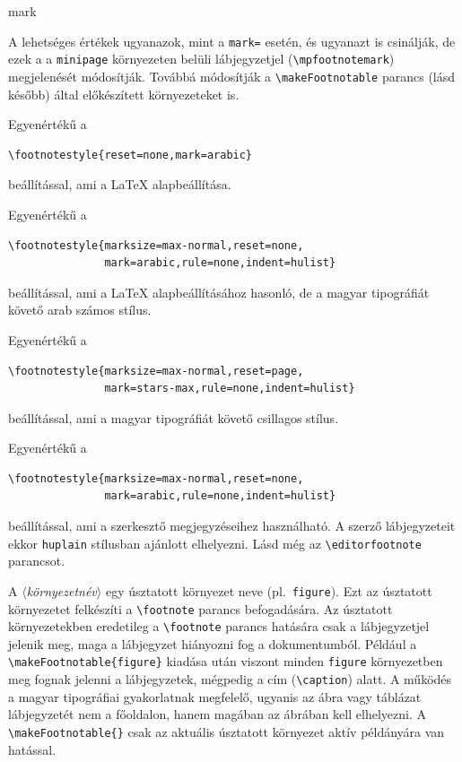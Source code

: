 \documentclass[12pt]{article}
\newcommand\param[1]{{\normalfont\slshape$\langle$#1$\rangle$}}
\begin{document}
\begin{description}
\begin{footstyle}{mark}
\end{footstyle}

\item[mpmark=\param{érték}]
A lehetséges értékek ugyanazok, mint a \texttt{mark=} esetén, és ugyanazt is csinálják, de ezek a a \texttt{minipage} környezeten belüli lábjegyzetjel (\verb|\mpfootnotemark|) megjelenését módosítják.
Továbbá módosítják a \verb|\makeFootnotable| parancs (lásd később) által előkészített környezeteket is.

\item[plain]
Egyenértékű a
\begin{verbatim}
\footnotestyle{reset=none,mark=arabic}
\end{verbatim}
beállítással, ami a \LaTeX{} alapbeállítása.

\item[huplain]
Egyenértékű a
\begin{verbatim}
\footnotestyle{marksize=max-normal,reset=none,
               mark=arabic,rule=none,indent=hulist}
\end{verbatim}
beállítással, ami a \LaTeX{} alapbeállításához hasonló, de a magyar tipográfiát követő arab számos stílus.

\item[starplain]
Egyenértékű a
\begin{verbatim}
\footnotestyle{marksize=max-normal,reset=page,
               mark=stars-max,rule=none,indent=hulist}
\end{verbatim}
beállítással, ami a magyar tipográfiát követő csillagos stílus.

\item[editor]
Egyenértékű a
\begin{verbatim}
\footnotestyle{marksize=max-normal,reset=none,
               mark=arabic,rule=none,indent=hulist}
\end{verbatim}
beállítással, ami a szerkesztő megjegyzéseihez használható.
A szerző lábjegyzeteit ekkor \texttt{huplain} stílusban ajánlott elhelyezni.
Lásd még az \verb|\editorfootnote| parancsot.

\end{description}

\begin{latexcode}
\makeFootnotable{(*\param{környezetnév}*)}
\end{latexcode}
A \param{környezetnév} egy úsztatott környezet neve (pl.~\texttt{figure}).
Ezt az úsztatott környezetet felkészíti a \verb|\footnote| parancs befogadására.
Az úsztatott környezetekben eredetileg a \verb|\footnote| parancs hatására csak a lábjegyzetjel jelenik meg, maga a lábjegyzet hiányozni fog a dokumentumból.
Például a \verb|\makeFootnotable{figure}| kiadása után viszont minden \texttt{figure} környezetben meg fognak jelenni a lábjegyzetek, mégpedig a cím (\verb|\caption|) alatt.
A működés a magyar tipográfiai gyakorlatnak megfelelő, ugyanis az ábra vagy táblázat lábjegyzetét nem a főoldalon, hanem magában az ábrában kell elhelyezni.
A \verb|\makeFootnotable{}| csak az aktuális úsztatott környezet aktív példányára van hatással.
\end{document}
